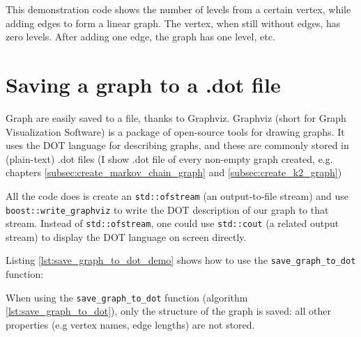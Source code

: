This demonstration code shows the number of levels from a certain vertex,
 while adding edges to form a linear graph.
 The vertex, when still without edges, has zero levels.
 After adding one edge, the graph has one level, etc.



\section{Saving a graph to a .dot file}
\label{subsec:save_graph_to_dot}

Graph are easily saved to a file, thanks to Graphviz.
Graphviz 
(short for Graph Visualization Software) is a package of open-source tools
for drawing graphs.
It uses the DOT language for describing graphs, and these are commonly
stored in (plain-text) .dot files (I show .dot file of every non-empty graph
created, e.g.
chapters \ref{subsec:create_markov_chain_graph}
and \ref{subsec:create_k2_graph})



All the code does is create an \verb;std::ofstream; 
(an output-to-file stream) 
and use 
\verb;boost::write_graphviz; 
to write the DOT description of our graph to that stream.
Instead of \verb;std::ofstream;, 
one could use \verb;std::cout; 
(a related output stream) to display the DOT language on screen directly.

Listing \ref{lst:save_graph_to_dot_demo}
shows how to use the \verb;save_graph_to_dot; function:



When using the \verb;save_graph_to_dot; function 
(algorithm \ref{lst:save_graph_to_dot}), 
only the structure of the graph is saved: all other properties 
(e.g vertex names, edge lengths) are not stored.

